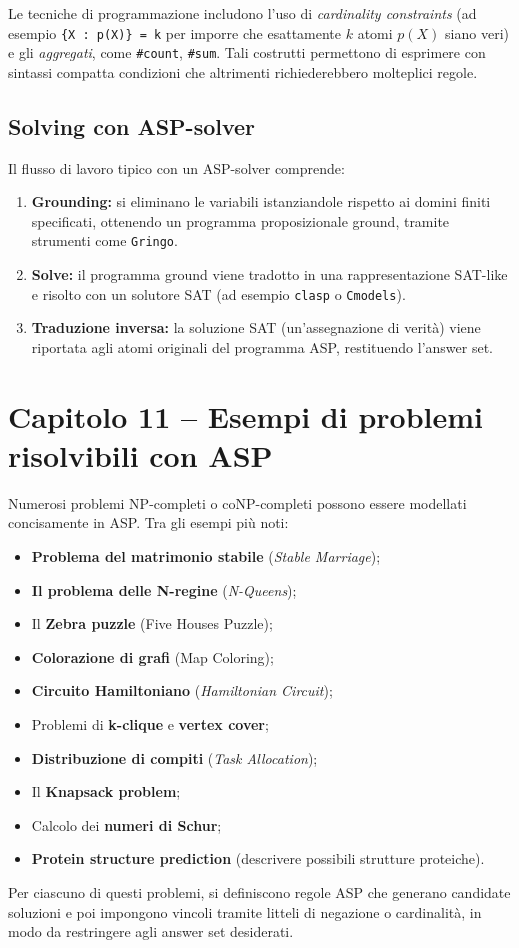 \documentclass[12pt]{article}
\begin{document}
Le tecniche di programmazione includono l'uso di \emph{cardinality constraints} (ad esempio \texttt{\{X : p(X)\} = k} per imporre che esattamente $k$ atomi $p(X)$ siano veri) e gli \emph{aggregati}, come \texttt{\#count}, \texttt{\#sum}. Tali costrutti permettono di esprimere con sintassi compatta condizioni che altrimenti richiederebbero molteplici regole.

\subsection*{Solving con ASP-solver}

Il flusso di lavoro tipico con un ASP-solver comprende:
\begin{enumerate}
  \item \textbf{Grounding:} si eliminano le variabili istanziandole rispetto ai domini finiti specificati, ottenendo un programma proposizionale ground, tramite strumenti come \texttt{Gringo}.
  \item \textbf{Solve:} il programma ground viene tradotto in una rappresentazione SAT-like e risolto con un solutore SAT (ad esempio \texttt{clasp} o \texttt{Cmodels}).
  \item \textbf{Traduzione inversa:} la soluzione SAT (un'assegnazione di verità) viene riportata agli atomi originali del programma ASP, restituendo l'answer set.
\end{enumerate}

\section*{Capitolo 11 – Esempi di problemi risolvibili con ASP}

Numerosi problemi NP-completi o coNP-completi possono essere modellati concisamente in ASP. Tra gli esempi più noti:
\begin{itemize}
  \item \textbf{Problema del matrimonio stabile} (\emph{Stable Marriage});
  \item \textbf{Il problema delle N-regine} (\emph{N-Queens});
  \item Il \textbf{Zebra puzzle} (Five Houses Puzzle);
  \item \textbf{Colorazione di grafi} (Map Coloring);
  \item \textbf{Circuito Hamiltoniano} (\emph{Hamiltonian Circuit});
  \item Problemi di \textbf{k-clique} e \textbf{vertex cover};
  \item \textbf{Distribuzione di compiti} (\emph{Task Allocation});
  \item Il \textbf{Knapsack problem};
  \item Calcolo dei \textbf{numeri di Schur};
  \item \textbf{Protein structure prediction} (descrivere possibili strutture proteiche).
\end{itemize}
Per ciascuno di questi problemi, si definiscono regole ASP che generano candidate soluzioni e poi impongono vincoli tramite litteli di negazione o cardinalità, in modo da restringere agli answer set desiderati.
\end{document}
